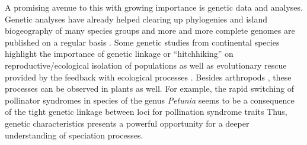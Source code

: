 \documentclass[a4paper]{scrartcl}
\begin{document}
A promising avenue to this with growing importance is genetic data and analyses.
Genetic analyses have already helped clearing up phylogenies and island biogeography of many species groups \cite{austinReconstructingIslandRadiation2004}\cite{emersonDiversificationForestBeetle2005}\cite{valenteUsingMolecularPhylogenies2018}%
and more and more complete genomes are published on a regular basis \cite{alonso-blanco135GenomesReveal2016} \cite{lewinEarthBioGenomeProject2018}.
Some genetic studies from continental species highlight the importance of genetic linkage or ``hitchhiking'' on reproductive/ecological isolation of populations \cite{hawthorneGeneticLinkageEcological2001}\cite{viaGeneticMosaicSuggests2008}
as well as evolutionary rescue provided by the feedback with ecological processes \cite{schiffersLimitedEvolutionaryRescue2012}.
Besides arthropods \cite{hawthorneGeneticLinkageEcological2001}, these processes can be observed in plants as well. %
For example, the rapid switching of pollinator syndromes in species of the genus \textit{Petunia} %
seems to be a consequence of the tight genetic linkage between loci for pollination syndrome traits \cite{hermannTightGeneticLinkage2013}
Thus, genetic characteristics presents a powerful opportunity for a deeper understanding of speciation processes.
\end{document}
